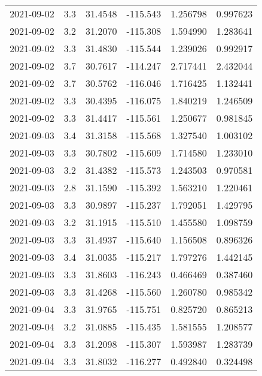 \begin{tabular}{lrrrrr}
2021-09-02 &       3.3 &  31.4548 &  -115.543 &         1.256798 &         0.997623 \\
2021-09-02 &       3.2 &  31.2070 &  -115.308 &         1.594990 &         1.283641 \\
2021-09-02 &       3.3 &  31.4830 &  -115.544 &         1.239026 &         0.992917 \\
2021-09-02 &       3.7 &  30.7617 &  -114.247 &         2.717441 &         2.432044 \\
2021-09-02 &       3.7 &  30.5762 &  -116.046 &         1.716425 &         1.132441 \\
2021-09-02 &       3.3 &  30.4395 &  -116.075 &         1.840219 &         1.246509 \\
2021-09-02 &       3.3 &  31.4417 &  -115.561 &         1.250677 &         0.981845 \\
2021-09-03 &       3.4 &  31.3158 &  -115.568 &         1.327540 &         1.003102 \\
2021-09-03 &       3.3 &  30.7802 &  -115.609 &         1.714580 &         1.233010 \\
2021-09-03 &       3.2 &  31.4382 &  -115.573 &         1.243503 &         0.970581 \\
2021-09-03 &       2.8 &  31.1590 &  -115.392 &         1.563210 &         1.220461 \\
2021-09-03 &       3.3 &  30.9897 &  -115.237 &         1.792051 &         1.429795 \\
2021-09-03 &       3.2 &  31.1915 &  -115.510 &         1.455580 &         1.098759 \\
2021-09-03 &       3.3 &  31.4937 &  -115.640 &         1.156508 &         0.896326 \\
2021-09-03 &       3.4 &  31.0035 &  -115.217 &         1.797276 &         1.442145 \\
2021-09-03 &       3.3 &  31.8603 &  -116.243 &         0.466469 &         0.387460 \\
2021-09-03 &       3.3 &  31.4268 &  -115.560 &         1.260780 &         0.985342 \\
2021-09-04 &       3.3 &  31.9765 &  -115.751 &         0.825720 &         0.865213 \\
2021-09-04 &       3.2 &  31.0885 &  -115.435 &         1.581555 &         1.208577 \\
2021-09-04 &       3.3 &  31.2098 &  -115.307 &         1.593987 &         1.283739 \\
2021-09-04 &       3.3 &  31.8032 &  -116.277 &         0.492840 &         0.324498 \\

\end{tabular}
